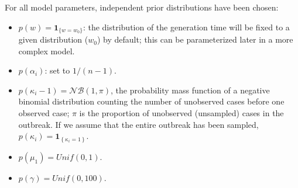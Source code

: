 \documentclass[10pt]{article}
\begin{document}
For all model parameters, independent prior distributions have been chosen:
\begin{itemize}
	\item $p(w) = \mathbf{1}_{\{w=w_0\}}$: the distribution of the generation time will be fixed to a given distribution ($w_0$) by default; this can be parameterized later in a more complex model.
	\item $p(\alpha_i)$: set to $1/(n-1)$.
	\item $p(\kappa_i - 1) = \mathcal{NB}(1,\pi)$, the probability mass function of a negative binomial distribution counting the number of unobserved cases before one observed case; $\pi$ is the proportion of unobserved (unsampled) cases in the outbreak. If we assume that the entire outbreak has been sampled, $p(\kappa_i) = \mathbf{1}_{\left\lbrace \kappa_i=1\right\rbrace}$.
	\item $p(\mu_1) = Unif(0,1)$.
	\item $p(\gamma) = Unif(0,100)$. 
\end{itemize}






%   
% 
\end{document}
